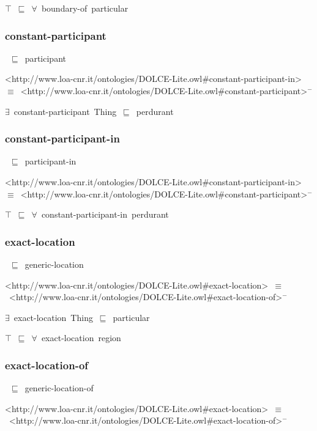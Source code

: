\documentclass{article}
\begin{document}
\ensuremath{\top}~\ensuremath{\sqsubseteq}~\ensuremath{\forall}~boundary-of~particular

\subsubsection*{constant-participant}

~\ensuremath{\sqsubseteq}~participant

<http://www.loa-cnr.it/ontologies/DOLCE-Lite.owl#constant-participant-in>~\ensuremath{\equiv}~<http://www.loa-cnr.it/ontologies/DOLCE-Lite.owl#constant-participant>\ensuremath{^-}

\ensuremath{\exists}~constant-participant~Thing~\ensuremath{\sqsubseteq}~perdurant

\subsubsection*{constant-participant-in}

~\ensuremath{\sqsubseteq}~participant-in

<http://www.loa-cnr.it/ontologies/DOLCE-Lite.owl#constant-participant-in>~\ensuremath{\equiv}~<http://www.loa-cnr.it/ontologies/DOLCE-Lite.owl#constant-participant>\ensuremath{^-}

\ensuremath{\top}~\ensuremath{\sqsubseteq}~\ensuremath{\forall}~constant-participant-in~perdurant

\subsubsection*{exact-location}

~\ensuremath{\sqsubseteq}~generic-location

<http://www.loa-cnr.it/ontologies/DOLCE-Lite.owl#exact-location>~\ensuremath{\equiv}~<http://www.loa-cnr.it/ontologies/DOLCE-Lite.owl#exact-location-of>\ensuremath{^-}

\ensuremath{\exists}~exact-location~Thing~\ensuremath{\sqsubseteq}~particular

\ensuremath{\top}~\ensuremath{\sqsubseteq}~\ensuremath{\forall}~exact-location~region

\subsubsection*{exact-location-of}

~\ensuremath{\sqsubseteq}~generic-location-of

<http://www.loa-cnr.it/ontologies/DOLCE-Lite.owl#exact-location>~\ensuremath{\equiv}~<http://www.loa-cnr.it/ontologies/DOLCE-Lite.owl#exact-location-of>\ensuremath{^-}
\end{document}
